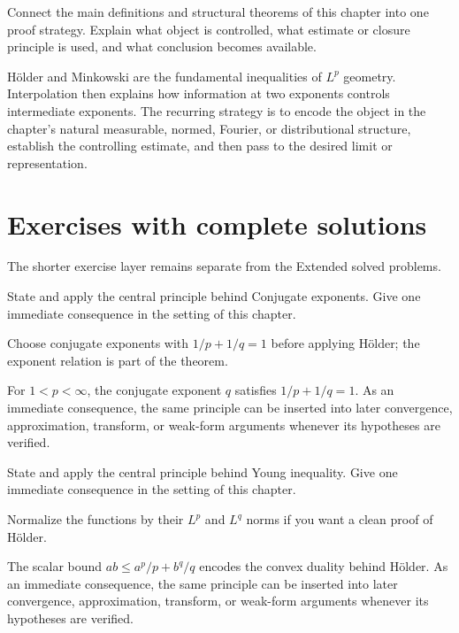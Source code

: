 \begin{problem}\label{prob:iii07-problem-12}
Connect the main definitions and structural theorems of this chapter into one proof strategy. Explain what object is controlled, what estimate or closure principle is used, and what conclusion becomes available.
\end{problem}
\begin{solution}
Hölder and Minkowski are the fundamental inequalities of $L^p$ geometry. Interpolation then explains how information at two exponents controls intermediate exponents. The recurring strategy is to encode the object in the chapter's natural measurable, normed, Fourier, or distributional structure, establish the controlling estimate, and then pass to the desired limit or representation.
\end{solution}
\section{Exercises with complete solutions}
The shorter exercise layer remains separate from the Extended solved problems.

\begin{exercise}\label{exr:iii07-01}
State and apply the central principle behind Conjugate exponents. Give one immediate consequence in the setting of this chapter.
\end{exercise}
\begin{hint}
Choose conjugate exponents with \(1/p+1/q=1\) before applying Hölder; the exponent relation is part of the theorem.
\end{hint}
\begin{solution}
For $1<p<\infty$, the conjugate exponent $q$ satisfies $1/p+1/q=1$. As an immediate consequence, the same principle can be inserted into later convergence, approximation, transform, or weak-form arguments whenever its hypotheses are verified.
\end{solution}

\begin{exercise}\label{exr:iii07-02}
State and apply the central principle behind Young inequality. Give one immediate consequence in the setting of this chapter.
\end{exercise}
\begin{hint}
Normalize the functions by their \(L^p\) and \(L^q\) norms if you want a clean proof of Hölder.
\end{hint}
\begin{solution}
The scalar bound $ab\le a^p/p+b^q/q$ encodes the convex duality behind Hölder. As an immediate consequence, the same principle can be inserted into later convergence, approximation, transform, or weak-form arguments whenever its hypotheses are verified.
\end{solution}

